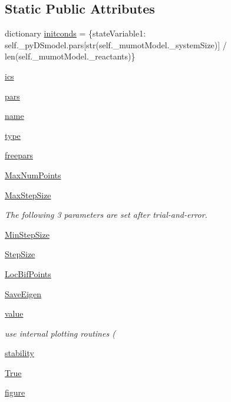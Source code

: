 \subsection*{Static Public Attributes}
\begin{DoxyCompactItemize}
\item 
dictionary \hyperlink{class_mu_mo_t_1_1_mu_mo_tbifurcation_view_a23ca095d6146b220be161f1f73017674}{initconds} = \{state\+Variable1\+: self.\+\_\+py\+D\+Smodel.\+pars\mbox{[}str(self.\+\_\+mumot\+Model.\+\_\+system\+Size)\mbox{]} / len(self.\+\_\+mumot\+Model.\+\_\+reactants)\}
\item 
\hyperlink{class_mu_mo_t_1_1_mu_mo_tbifurcation_view_a08c7b0edb053705a8c47fe487b6f53bd}{ics}
\item 
\hyperlink{class_mu_mo_t_1_1_mu_mo_tbifurcation_view_a372cc7d4f485e77e35668d40b507d0e5}{pars}
\item 
\hyperlink{class_mu_mo_t_1_1_mu_mo_tbifurcation_view_ab74e6bf80237ddc4109968cedc58c151}{name}
\item 
\hyperlink{class_mu_mo_t_1_1_mu_mo_tbifurcation_view_a7aead736a07eaf25623ad7bfa1f0ee2d}{type}
\item 
\hyperlink{class_mu_mo_t_1_1_mu_mo_tbifurcation_view_a15cf90b3888db001a8299a477d50af98}{freepars}
\item 
\hyperlink{class_mu_mo_t_1_1_mu_mo_tbifurcation_view_aaa677c130e36435865b68ff6230a932d}{Max\+Num\+Points}
\item 
\hyperlink{class_mu_mo_t_1_1_mu_mo_tbifurcation_view_a0a7557ffe670b6a318afa8bd9851d2fc}{Max\+Step\+Size}
\begin{DoxyCompactList}\small\item\em The following 3 parameters are set after trial-\/and-\/error. \end{DoxyCompactList}\item 
\hyperlink{class_mu_mo_t_1_1_mu_mo_tbifurcation_view_a5fe506ca005e76a55ccd505a36e17fe6}{Min\+Step\+Size}
\item 
\hyperlink{class_mu_mo_t_1_1_mu_mo_tbifurcation_view_a9c25479455e9bdd389f37c4bccfefea1}{Step\+Size}
\item 
\hyperlink{class_mu_mo_t_1_1_mu_mo_tbifurcation_view_a7ff5325c1fceeebd63c3e4805a2206c8}{Loc\+Bif\+Points}
\item 
\hyperlink{class_mu_mo_t_1_1_mu_mo_tbifurcation_view_a040a7ecbcbaca807aeaec6d5c81801d5}{Save\+Eigen}
\item 
\hyperlink{class_mu_mo_t_1_1_mu_mo_tbifurcation_view_afcc7a4b78ecd8fa7e713f8cfa0f51017}{value}
\begin{DoxyCompactList}\small\item\em use internal plotting routines ( \end{DoxyCompactList}\item 
\hyperlink{class_mu_mo_t_1_1_mu_mo_tbifurcation_view_a1df8fcdacfec00fc258a3c72772c2f18}{stability}
\item 
\hyperlink{class_mu_mo_t_1_1_mu_mo_tbifurcation_view_a643a20c0c59588a0f741a6095e2025fd}{True}
\item 
\hyperlink{class_mu_mo_t_1_1_mu_mo_tbifurcation_view_a391e34f2de441d79152a7b3d6e4c9c86}{figure}
\end{DoxyCompactItemize}
